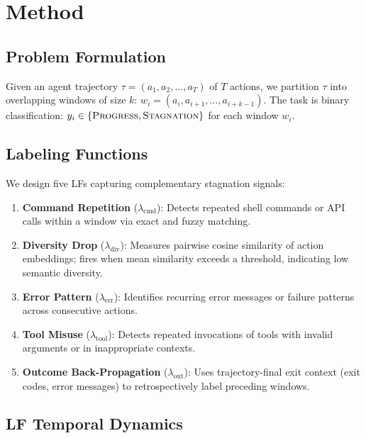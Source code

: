 \documentclass[11pt]{article}
\begin{document}
\section{Method}
\label{sec:method}

\subsection{Problem Formulation}

Given an agent trajectory $\tau = (a_1, a_2, \ldots, a_T)$ of $T$ actions, we partition $\tau$ into overlapping windows of size $k$: $w_i = (a_i, a_{i+1}, \ldots, a_{i+k-1})$.
The task is binary classification: $y_i \in \{\textsc{Progress}, \textsc{Stagnation}\}$ for each window $w_i$.

\subsection{Labeling Functions}
\label{sec:lfs}

We design five LFs capturing complementary stagnation signals:

\begin{enumerate}
\item \textbf{Command Repetition} ($\lambda_\text{cmd}$): Detects repeated shell commands or API calls within a window via exact and fuzzy matching.
\item \textbf{Diversity Drop} ($\lambda_\text{div}$): Measures pairwise cosine similarity of action embeddings; fires when mean similarity exceeds a threshold, indicating low semantic diversity.
\item \textbf{Error Pattern} ($\lambda_\text{err}$): Identifies recurring error messages or failure patterns across consecutive actions.
\item \textbf{Tool Misuse} ($\lambda_\text{tool}$): Detects repeated invocations of tools with invalid arguments or in inappropriate contexts.
\item \textbf{Outcome Back-Propagation} ($\lambda_\text{out}$): Uses trajectory-final exit context (exit codes, error messages) to retrospectively label preceding windows.
\end{enumerate}

\subsection{LF Temporal Dynamics}
\label{sec:temporal_dynamics}
\end{document}
